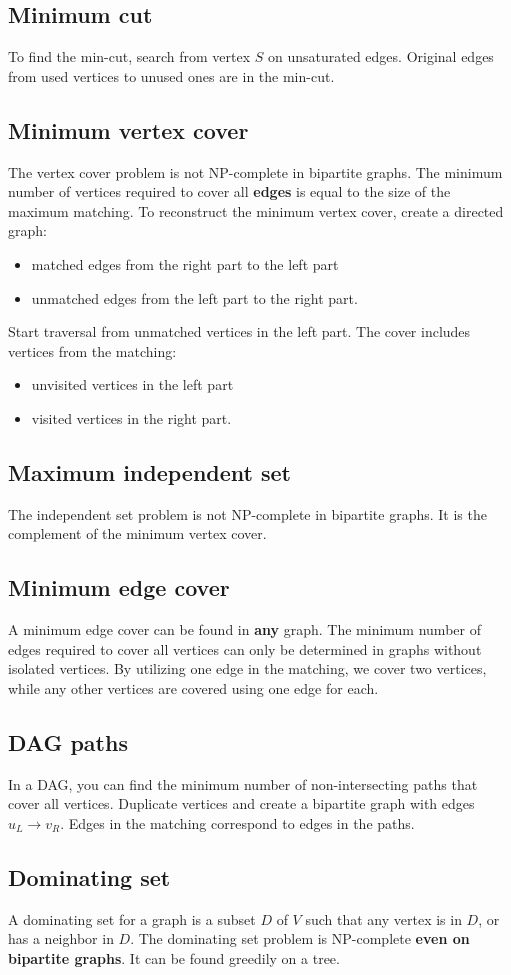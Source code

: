 \subsection*{Minimum cut}
To find the min-cut, search from vertex $S$ on unsaturated edges. 
Original edges from used vertices to unused ones are in the min-cut.

\subsection*{Minimum vertex cover}
The vertex cover problem is not NP-complete in bipartite graphs. 
The minimum number of vertices required to cover all \textbf{edges} is equal to the size of the maximum matching. 
To reconstruct the minimum vertex cover, create a directed graph:

\begin{itemize}
\setlength\itemsep{0em}
\item matched edges from the right part to the left part
\item unmatched edges from the left part to the right part.
\end{itemize}

Start traversal from unmatched vertices in the left part.
The cover includes vertices from the matching:
\begin{itemize}
\setlength\itemsep{0em}
\item unvisited vertices in the left part
\item visited vertices in the right part.
\end{itemize}

\subsection*{Maximum independent set}
The independent set problem is not NP-complete in bipartite graphs. 
It is the complement of the minimum vertex cover.

\subsection*{Minimum edge cover}
A minimum edge cover can be found in \textbf{any} graph. 
The minimum number of edges required to cover all vertices can only be determined in graphs without isolated vertices.
By utilizing one edge in the matching, we cover two vertices, while any other vertices are covered using one edge for each.

\subsection*{DAG paths}
In a DAG, you can find the minimum number of non-intersecting paths that cover all vertices. 
Duplicate vertices and create a bipartite graph with edges $u_L \rightarrow v_R$. 
Edges in the matching correspond to edges in the paths.

\subsection*{Dominating set}
A dominating set for a graph is a subset $D$ of $V$ such that any vertex is in $D$, or has a neighbor in $D$.
The dominating set problem is NP-complete \textbf{even on bipartite graphs}.
It can be found greedily on a tree.